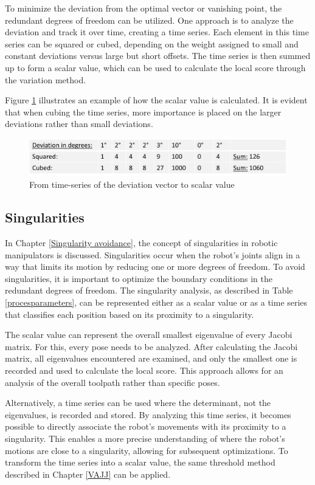 To minimize the deviation from the optimal vector or vanishing point, the redundant degrees of freedom can be utilized. One approach is to analyze the deviation and track it over time, creating a time series. Each element in this time series can be squared or cubed, depending on the weight assigned to small and constant deviations versus large but short offsets. The time series is then summed up to form a scalar value, which can be used to calculate the local score through the variation method.


Figure \ref{deviation} illustrates an example of how the scalar value is calculated. It is evident that when cubing the time series, more importance is placed on the larger deviations rather than small deviations.


\begin{figure}[H]
	\centerline{\includegraphics[width=.9\textwidth]{figures/devi.png}}
	\caption{From time-series of the deviation vector to scalar value}
	\label{deviation}
\end{figure}
 

\subsection{Singularities}

In Chapter \ref{Singularity avoidance}, the concept of singularities in robotic manipulators is discussed. Singularities occur when the robot's joints align in a way that limits its motion by reducing one or more degrees of freedom. To avoid singularities, it is important to optimize the boundary conditions in the redundant degrees of freedom. The singularity analysis, as described in Table \ref{procesparameters}, can be represented either as a scalar value or as a time series that classifies each position based on its proximity to a singularity.

The scalar value can represent the overall smallest eigenvalue of every Jacobi matrix. For this, every pose needs to be analyzed. After calculating the Jacobi matrix, all eigenvalues encountered are examined, and only the smallest one is recorded and used to calculate the local score. This approach allows for an analysis of the overall toolpath rather than specific poses.

Alternatively, a time series can be used where the determinant, not the eigenvalues, is recorded and stored. By analyzing this time series, it becomes possible to directly associate the robot's movements with its proximity to a singularity. This enables a more precise understanding of where the robot's motions are close to a singularity, allowing for subsequent optimizations. To transform the time series into a scalar value, the same threshold method described in Chapter \ref{VAJJ} can be applied.
  
